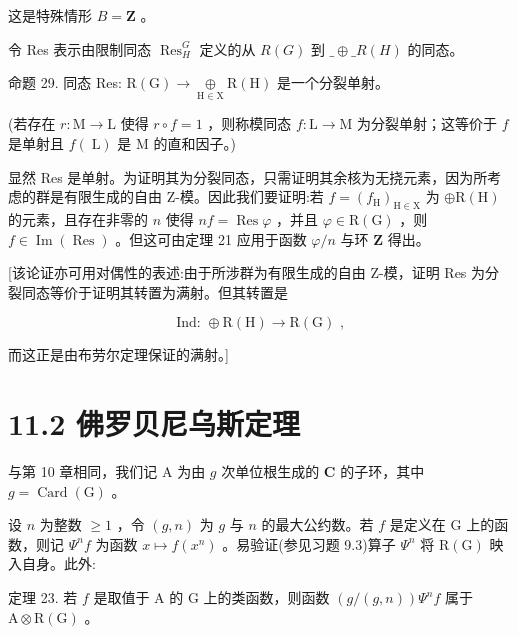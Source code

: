 \documentclass[10pt]{article}
\begin{document}
这是特殊情形 \(B = \mathbf{Z}\) 。

令 Res 表示由限制同态 \({\operatorname{Res}}_{H}^{G}\) 定义的从 \(R\left( G\right)\) 到 \(\_  \oplus  \_ R\left( H\right)\) 的同态。

命题 29. 同态 Res: \(\mathrm{R}\left( \mathrm{G}\right)  \rightarrow  \underset{\mathrm{H} \in  \mathrm{X}}{ \oplus  }\mathrm{R}\left( \mathrm{H}\right)\) 是一个分裂单射。

(若存在 \(r : \mathrm{M} \rightarrow  \mathrm{L}\) 使得 \(r \circ  f = 1\) ，则称模同态 \(f : \mathrm{L} \rightarrow  \mathrm{M}\) 为分裂单射；这等价于 \(f\) 是单射且 \(f\left( \mathrm{\;L}\right)\) 是 \(\mathrm{M}\) 的直和因子。)

显然 Res 是单射。为证明其为分裂同态，只需证明其余核为无挠元素，因为所考虑的群是有限生成的自由 Z-模。因此我们要证明:若 \(f = {\left( {f}_{\mathrm{H}}\right) }_{\mathrm{H} \in  \mathrm{X}}\) 为 \(\oplus  \mathrm{R}\left( \mathrm{H}\right)\) 的元素，且存在非零的 \(n\) 使得 \({nf} = \operatorname{Res}\varphi\) ，并且 \(\varphi  \in  \mathrm{R}\left( \mathrm{G}\right)\) ，则 \(f \in  \operatorname{Im}\left( \operatorname{Res}\right)\) 。但这可由定理 21 应用于函数 \(\varphi /n\) 与环 \(\mathbf{Z}\) 得出。

[该论证亦可用对偶性的表述:由于所涉群为有限生成的自由 Z-模，证明 Res 为分裂同态等价于证明其转置为满射。但其转置是

\[
\text{ Ind: } \oplus  \mathrm{R}\left( \mathrm{H}\right)  \rightarrow  \mathrm{R}\left( \mathrm{G}\right) \text{ , }
\]

而这正是由布劳尔定理保证的满射。]

\section*{11.2 佛罗贝尼乌斯定理}

与第 10 章相同，我们记 A 为由 \(g\) 次单位根生成的 \(\mathbf{C}\) 的子环，其中 \(g = \operatorname{Card}\left( \mathrm{G}\right)\) 。

设 \(n\) 为整数 \(\geq  1\) ，令 \(\left( {g,n}\right)\) 为 \(g\) 与 \(n\) 的最大公约数。若 \(f\) 是定义在 \(\mathrm{G}\) 上的函数，则记 \({\Psi }^{n}f\) 为函数 \(x \mapsto  f\left( {x}^{n}\right)\) 。易验证(参见习题 9.3)算子 \({\Psi }^{n}\) 将 \(\mathrm{R}\left( \mathrm{G}\right)\) 映入自身。此外:

定理 23. 若 \(f\) 是取值于 \(\mathrm{A}\) 的 \(\mathrm{G}\) 上的类函数，则函数 \(\left( {g/\left( {g,n}\right) }\right) {\Psi }^{n}f\) 属于 \(\mathrm{A} \otimes  \mathrm{R}\left( \mathrm{G}\right)\) 。
\end{document}
